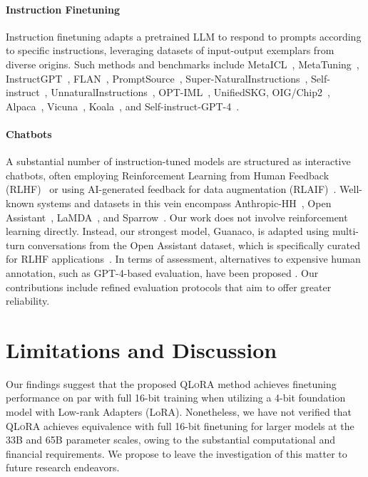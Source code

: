 \paragraph{Instruction Finetuning} Instruction finetuning adapts a pretrained LLM to respond to prompts according to specific instructions, leveraging datasets of input-output exemplars from diverse origins. Such methods and benchmarks include MetaICL~\citep{min2021metaicl}, MetaTuning~\citep{zhong2021adapting}, InstructGPT~\citep{ouyang2022training}, FLAN~\citep{wei2021finetuned,chung2022scaling}, PromptSource~\citep{bach2022promptsource}, Super-NaturalInstructions~\citep{wang2022super,sanh2021multitask}, Self-instruct~\citep{wang2022self}, UnnaturalInstructions~\citep{honovich2022unnatural}, OPT-IML~\citep{iyer2022opt}, UnifiedSKG\citep{xie2022unifiedskg}, OIG/Chip2~\citep{laion2023}, Alpaca~\citep{alpaca}, Vicuna~\citep{vicuna2023}, Koala~\citep{koala_blogpost_2023}, and Self-instruct-GPT-4~\citep{peng2023instruction}.

\paragraph{Chatbots} A substantial number of instruction-tuned models are structured as interactive chatbots, often employing Reinforcement Learning from Human Feedback (RLHF)~\citep{christiano2017deep} or using AI-generated feedback for data augmentation (RLAIF)~\citep{bai2022constitutional}. Well-known systems and datasets in this vein encompass Anthropic-HH~\citep{askell2021general,bai2022training}, Open Assistant~\citep{kopf2023openassistant}, LaMDA~\citep{thoppilan2022lamda}, and Sparrow~\citep{glaese2022improving}. Our work does not involve reinforcement learning directly. Instead, our strongest model, Guanaco, is adapted using multi-turn conversations from the Open Assistant dataset, which is specifically curated for RLHF applications~\citep{kopf2023openassistant}. In terms of assessment, alternatives to expensive human annotation, such as GPT-4-based evaluation, have been proposed \citep{vicuna2023,peng2023instruction}. Our contributions include refined evaluation protocols that aim to offer greater reliability.

\section{Limitations and Discussion}

Our findings suggest that the proposed \textsc{QLoRA} method achieves finetuning performance on par with full 16-bit training when utilizing a 4-bit foundation model with Low-rank Adapters (LoRA). Nonetheless, we have not verified that \textsc{QLoRA} achieves equivalence with full 16-bit finetuning for larger models at the 33B and 65B parameter scales, owing to the substantial computational and financial requirements. We propose to leave the investigation of this matter to future research endeavors.

